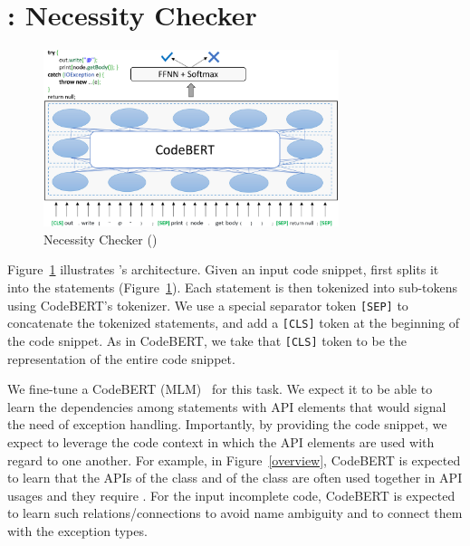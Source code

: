 \section{{\xblock}:  Necessity Checker}
\label{xblock:sec}

\begin{figure}[t]
 	\centering
 	\includegraphics[width=3.4in]{xblock-6.png} %
        \vspace{-20pt}
 	\caption{ Necessity Checker ({\xblock})}
 	\label{fig:xblock}	
\end{figure}

Figure~\ref{fig:xblock} illustrates {\xblock}'s architecture.  Given
an input code snippet, {\xblock} first splits it into the statements
(Figure~\ref{fig:xblock}). Each statement is then tokenized into
sub-tokens using CodeBERT's tokenizer. We use a special separator
token \texttt{[SEP]} to concatenate the tokenized statements, and add
a \texttt{[CLS]} token at the beginning of the code snippet. As in
CodeBERT, we take that \texttt{[CLS]} token to be the representation
of the entire code snippet.

We fine-tune a CodeBERT (MLM)~\cite{codebertMLM} for this task.
We expect it to be able to learn the dependencies among statements
with API elements that would signal the need of exception
handling. Importantly, by providing the code snippet, we expect to
leverage the code context in which the API elements are used with
regard to one another. For example, in Figure~\ref{overview}, CodeBERT
is expected to learn that the APIs  of the
class  and  of the class
 are often used together in API usages and they
require . For the input incomplete code,
CodeBERT is expected to learn such relations/connections to avoid name
ambiguity and to connect them with the exception types.



